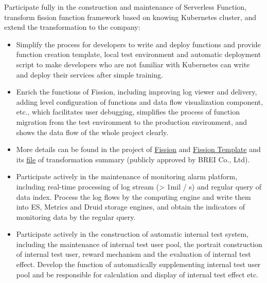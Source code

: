 \documentclass{resume}
\begin{document}
Participate fully in the construction and maintenance of Serverless Function, transform fission function framework based on knowing Kubernetes cluster, and extend the transformation to the company:
\begin{itemize}[topsep = 0 pt, partopsep = 0pt]
  \item Simplify the process for developers to write and deploy functions and provide function creation template, local test environment and automatic deployment script to make developers who are not familiar with Kubernetes can write and deploy their services after simple training.
  \item Enrich the functions of Fission, including improving log viewer and delivery, adding level configuration of functions and data flow visualization component, etc., which facilitates user debugging, simplifies the process of function migration from the test environment to the production environment, and shows the data flow of the whole project clearly.
  \item More details can be found in the project of \href{https://github.com/jingtaozhang18/fission}{Fission} and \href{https://github.com/jingtaozhang18/fission-template}{Fission Template} and its \href{https://jingtao.fun/%E6%BA%90%E7%A0%81-Fission%E5%8A%9F%E8%83%BD%E6%8B%93%E5%B1%95/}{file} of transformation summary (publicly approved by BREI Co., Ltd).
\end{itemize}

\begin{itemize}[topsep = 0 pt, partopsep = 0pt]
  \item Participate actively in the maintenance of monitoring alarm platform, including real-time processing of log stream (> 1mil / s) and regular query of data index. Process the log flows by the computing engine and write them into ES, Metrics and Druid storage engines, and obtain the indicators of monitoring data by the regular query.
  \item Participate actively in the construction of automatic internal test system, including the maintenance of internal test user pool, the portrait construction of internal test user, reward mechanism and the evaluation of internal test effect. Develop the function of automatically supplementing internal test user pool and be responsible for calculation and display of internal test effect etc.
\end{itemize}
\end{document}
